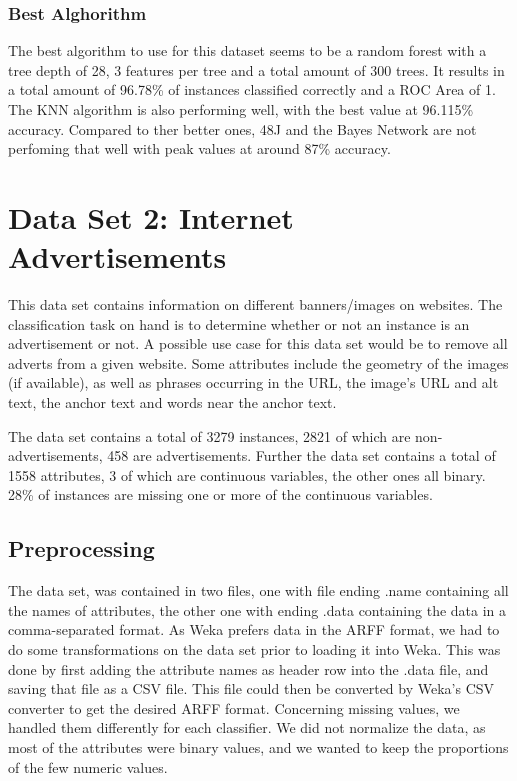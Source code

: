 \documentclass{article}
\begin{document}
\subsubsection{Best Alghorithm}
The best algorithm to use for this dataset seems to be a random forest with a tree depth of 28, 3 features per tree and a total amount of 300 trees. It results in a total amount of 96.78\% of instances classified correctly and a ROC Area of 1. The KNN algorithm is also performing well, with the best value at 96.115\% accuracy. Compared to ther better ones, 48J and the Bayes Network are not perfoming that well with peak values at around 87\% accuracy. 


\section{Data Set 2: Internet Advertisements}
This data set contains information on different banners/images on websites. The classification task on hand is to determine whether or not an instance is an advertisement or not. A possible use case for this data set would be to remove all adverts from a given website. Some attributes include the geometry of the images (if available), as well as phrases occurring in the URL, the image's URL and alt text, the anchor text and words near the anchor text.

The data set contains a total of 3279 instances, 2821 of which are non-advertisements, 458 are advertisements. Further the data set contains a total of 1558 attributes, 3 of which are continuous variables, the other ones all binary. 28\% of instances are missing one or more of the continuous variables.


\subsection{Preprocessing}
The data set, was contained in two files, one with file ending .name containing all the names of attributes, the other one with ending .data containing the data in a comma-separated format. As Weka prefers data in the ARFF format, we had to do some transformations on the data set prior to loading it into Weka. This was done by first adding the attribute names as header row into the .data file, and saving that file as a CSV file. This file could then be converted by Weka's CSV converter to get the desired ARFF format.
Concerning missing values, we handled them differently for each classifier. We did not normalize the data, as most of the attributes were binary values, and we wanted to keep the proportions of the few numeric values.
\end{document}
